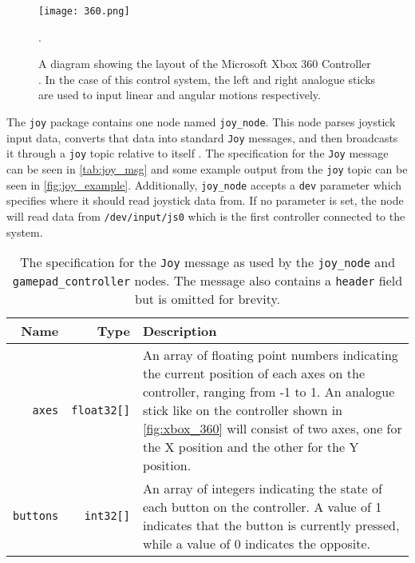 \begin{figure}[!h]
	\centering
	\texttt{[image: 360.png]}
	\caption{A diagram showing the layout of the Microsoft Xbox 360 Controller \cite{360_controller}. In the case of this control system, the left and right analogue sticks are used to input linear and angular motions respectively.}.
	\label{fig:xbox_360}
\end{figure}

The \texttt{joy} package contains one node named \texttt{joy\_node}. This node parses joystick input data, converts that data into standard \texttt{Joy} messages, and then broadcasts it through a \texttt{joy} topic relative to itself \cite{ros_wiki_joy}. The specification for the \texttt{Joy} message can be seen in \autoref{tab:joy_msg} and some example output from the \texttt{joy} topic can be seen in \autoref{fig:joy_example}. Additionally, \texttt{joy\_node} accepts a \texttt{dev} parameter which specifies where it should read joystick data from. If no parameter is set, the node will read data from \texttt{/dev/input/js0} which is the first controller connected to the system. 

\begin{table}[!h]
	\centering
	\begin{tabular}{ r r p{10cm} }
		\toprule
		\textbf{Name} & \textbf{Type} & \textbf{Description} \\
		\midrule

		\texttt{axes} & 
		\texttt{float32[]} &
		An array of floating point numbers indicating the current position of each axes on the controller, ranging from -1 to 1. An analogue stick like on the controller shown in \autoref{fig:xbox_360} will consist of two axes, one for the X position and the other for the Y position. \\
		\hline
		\texttt{buttons} & 
		\texttt{int32[]} & 
		An array of integers indicating the state of each button on the controller. A value of 1 indicates that the button is currently pressed, while a value of 0 indicates the opposite. \\
		\bottomrule
	\end{tabular}
	\caption{The specification for the \texttt{Joy} message as used by the \texttt{joy\_node} and \texttt{gamepad\_controller} nodes. The message also contains a \texttt{header} field but is omitted for brevity.}
	\label{tab:joy_msg}
\end{table}

